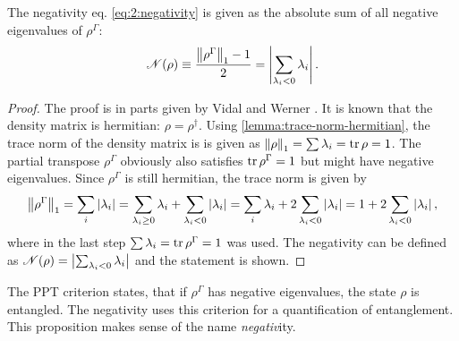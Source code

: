 \begin{proposition}\label{proposition:negativity}
  The negativity eq. \eqref{eq:2:negativity} is given as the absolute sum of all negative eigenvalues of $\rho^{\Gamma}$: 
\begin{equation}
    \mathscr{N}(\rho) \equiv \frac{\left\lVert\rho^{\Gamma}\right\rVert_1 - 1}{2} = \left\lvert\sum_{\lambda_i < 0} \lambda_i\right\rvert.
\end{equation}
\end{proposition}
\begin{proof}
  The proof is in parts given by Vidal and Werner \cite{Vidal_2001}. It is known that the density matrix is hermitian: $\rho = \rho^\dagger$. Using \cref{lemma:trace-norm-hermitian}, the trace norm of the density matrix is is given as $\left\lVert\rho\right\rVert_1=\sum \lambda_i = \tr \rho = 1$. The partial transpose $\rho^{\Gamma}$ obviously also satisfies $\tr \rho^{\Gamma} = 1$ but might have negative eigenvalues. Since $\rho^{\Gamma}$ is still hermitian, the trace norm is given by
  \begin{equation*}
    \left\lVert\rho^{\Gamma}\right\rVert_1 = \sum_i\left\lvert\lambda_i\right\rvert = \sum_{\lambda_i \ge 0} \lambda_i + \sum_{\lambda_i < 0} \left\lvert\lambda_i\right\rvert = \sum_i \lambda_i + 2\sum_{\lambda_i < 0} \left\lvert\lambda_i\right\rvert = 1 + 2\sum_{\lambda_i < 0} \left\lvert\lambda_i\right\rvert ,
  \end{equation*}
  where in the last step $\sum \lambda_i = \tr \rho^{\Gamma} = 1$ was used. The negativity can be defined as $\mathscr{N}(\rho) = \left\lvert\sum_{\lambda_i < 0} \lambda_i\right\rvert$ and the statement is shown.
\end{proof}
\begin{remark}
  The PPT criterion states, that if $\rho^{\Gamma}$ has negative eigenvalues, the state $\rho$ is entangled. The negativity uses this criterion for a quantification of entanglement. This proposition makes sense of the name \textit{negativ}ity.
\end{remark}

